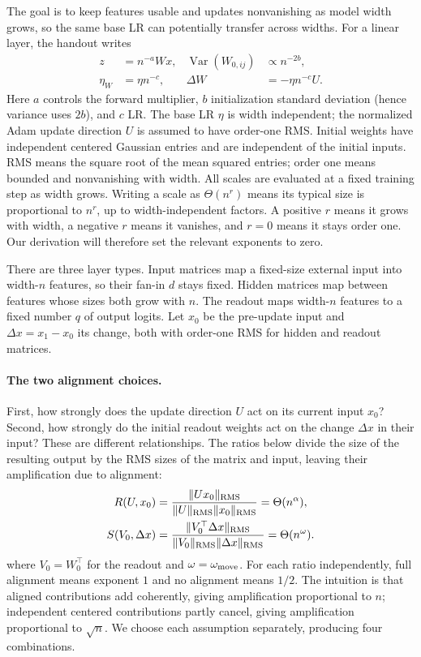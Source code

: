 \documentclass{article}
\begin{document}
The goal is to keep features usable and updates nonvanishing as model
width grows, so the same base LR can potentially transfer across widths.
For a linear layer, the handout writes
\[
\begin{aligned}
z&=n^{-a}Wx, & \operatorname{Var}(W_{0,ij})&\propto n^{-2b},\\
\eta_W&=\eta n^{-c}, & \Delta W&=-\eta n^{-c}U.
\end{aligned}
\]
Here $a$ controls the forward multiplier, $b$ initialization standard
deviation (hence variance uses $2b$), and $c$ LR. The base LR $\eta$ is
width independent; the normalized Adam update direction $U$ is assumed
to have order-one RMS. Initial weights have independent centered
Gaussian entries and are independent of the initial inputs.
RMS means the square root of the mean squared
entries; order one means bounded and nonvanishing with width.
All scales are evaluated at a fixed training step as width grows.
Writing a scale as $\Theta(n^r)$ means its typical size is proportional
to $n^r$, up to width-independent factors. A positive $r$ means it grows
with width, a negative $r$ means it vanishes, and $r=0$ means it stays
order one. Our derivation will therefore set the relevant exponents to zero.

There are three layer types. Input matrices map a fixed-size external
input into width-$n$ features, so their fan-in $d$ stays fixed.
Hidden matrices map between features whose sizes both grow with $n$.
The readout maps width-$n$ features to a fixed number $q$ of output logits.
Let $x_0$ be the pre-update input and $\Delta x=x_1-x_0$ its change,
both with order-one RMS for hidden and readout matrices.

\paragraph{The two alignment choices.}
First, how strongly does the update direction $U$ act on its current
input $x_0$? Second, how strongly do the initial readout weights act on
the change $\Delta x$ in their input? These are different relationships.
The ratios below divide the size of the resulting output by the RMS
sizes of the matrix and input, leaving their amplification due to alignment:
\[
\begin{aligned}
R(U,x_0)&=\frac{\|Ux_0\|_{\rm RMS}}
{\|U\|_{\rm RMS}\|x_0\|_{\rm RMS}}=\Theta(n^\alpha),\\
S(V_0,\Delta x)&=\frac{\|V_0^\top\Delta x\|_{\rm RMS}}
{\|V_0\|_{\rm RMS}\|\Delta x\|_{\rm RMS}}=\Theta(n^\omega).
\end{aligned}
\]
where $V_0=W_0^\top$ for the readout and
$\omega=\omega_{\rm move}$. For each ratio independently, full alignment
means exponent $1$ and no alignment means $1/2$. The intuition is that
aligned contributions add coherently, giving amplification proportional
to $n$; independent centered contributions partly cancel, giving
amplification proportional to $\sqrt n$. We choose each assumption
separately, producing four combinations.
\end{document}
